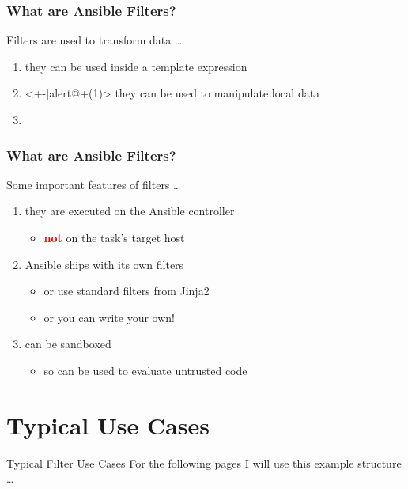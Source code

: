 \documentclass[pdf]{beamer}
\begin{document}
\begin{frame}
  \frametitle{What are Ansible Filters?}
  Filters are used to transform data \ldots
  \pause{}
  \begin{enumerate}
    \item<+-> {they can be used inside a template expression}
    \item<+-|alert@+(1)> {they can be used to manipulate local data}
    \item[]
  \end{enumerate}
\end{frame}

\begin{frame}
  \frametitle{What are Ansible Filters?}
  Some important features of filters \ldots
  \pause{}
  \begin{enumerate}[<+-|alert@+>]
    \item they are executed on the Ansible controller
      \begin{itemize}[<+-|alert@+>]
        \item \textcolor{red}{\textbf{not}} on the task's target host
      \end{itemize}
    \item Ansible ships with its own filters
      \begin{itemize}[<+-|alert@+>]
        \item or use standard filters from Jinja2
        \item or you can write your own!
      \end{itemize}
    \item can be sandboxed
      \begin{itemize}[<+-|alert@+>]
        \item so can be used to evaluate untrusted code
      \end{itemize}
  \end{enumerate}
\end{frame}

\section{Typical Use Cases}

\begin{frame}[t,fragile]{Typical Filter Use Cases}
  For the following pages I will use this example structure \ldots
  \inputminted[firstline=5,lastline=14]{yaml}{filter-examples.yaml}
\end{frame}
\end{document}
